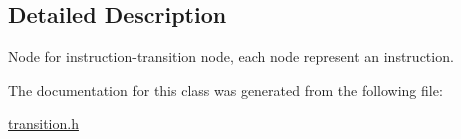 \subsection{Detailed Description}
Node for instruction-\/transition node, each node represent an instruction. 

The documentation for this class was generated from the following file\+:\begin{DoxyCompactItemize}
\item 
\mbox{\hyperlink{transition_8h}{transition.\+h}}\end{DoxyCompactItemize}
